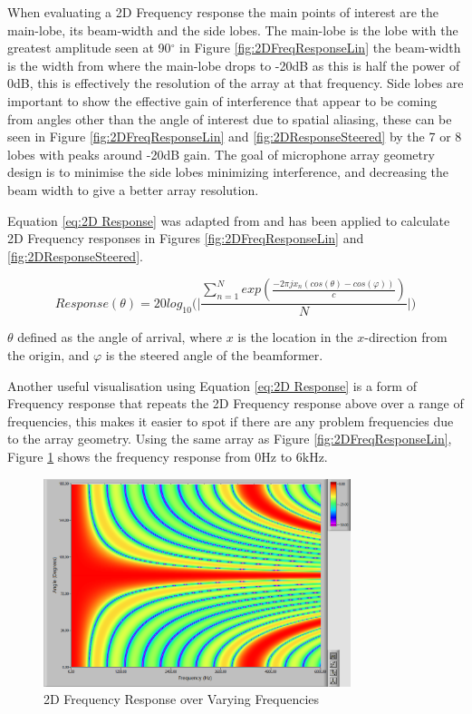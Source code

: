 \documentclass{UoNMCHA}
\numberwithin{equation}{section}
\begin{document}
    When evaluating a 2D Frequency response the main points of interest are the main-lobe, its beam-width and the side lobes. The main-lobe is the lobe with the greatest amplitude seen at 90$^{\circ}$ in Figure \ref{fig:2DFreqResponseLin} the beam-width is the width from where the main-lobe drops to -20dB as this is half the power of 0dB, this is effectively the resolution of the array at that frequency. Side lobes are important to show the effective gain of interference that appear to be coming from angles other than the angle of interest due to spatial aliasing, these can be seen in Figure \ref{fig:2DFreqResponseLin} and \ref{fig:2DResponseSteered} by the 7 or 8 lobes with peaks around -20dB gain. The goal of microphone array geometry design is to minimise the side lobes minimizing interference, and decreasing the beam width to give a better array resolution.
    
    Equation \ref{eq:2D Response} was adapted from \citet{Ben08} and has been applied to calculate 2D Frequency responses in Figures \ref{fig:2DFreqResponseLin} and \ref{fig:2DResponseSteered}.
    
    \begin{equation}
        Response(\theta) = 20log_{10} \Big( \Big|\frac{\sum_{n=1}^N exp(\frac{-2\pi jx_n(cos(\theta)-cos(\varphi))}{c})}{N}\Big| \Big)
        \label{eq:2D Response}
    \end{equation}
    
    $\theta$ defined as the angle of arrival, where $x$ is the location in the $x$-direction from the origin, and $\varphi$ is the steered angle of the beamformer.
    
    Another useful visualisation using Equation \ref{eq:2D Response} is a form of Frequency response that repeats the 2D Frequency response above over a range of frequencies, this makes it easier to spot if there are any problem frequencies due to the array geometry. Using the same array as Figure \ref{fig:2DFreqResponseLin}, Figure \ref{fig:2DVaryFreqResp} shows the frequency response from $0$Hz to $6$kHz.
    
    \begin{figure}[H]
        \centering
        \includegraphics[keepaspectratio, width = 0.8\textwidth]{Figures/2DVaryFreqResp.png}
        \caption{2D Frequency Response over Varying Frequencies}
        \label{fig:2DVaryFreqResp}
    \end{figure}
    
\end{document}
